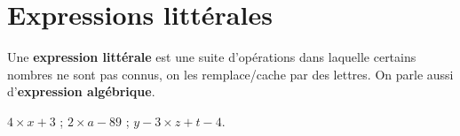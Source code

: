 \section{Expressions littérales} %

\medskip

\begin{definition}
   Une {\bf expression littérale} est une suite d'op\'erations dans laquelle certains nombres ne sont pas connus,
   on les remplace/cache par des lettres. On parle aussi d'{\bf expression algébrique}.
\end{definition}

\begin{exemple}
   $4\times x+3$ \; ; \; $2\times a-89$ \; ; \; $y-3\times z+t-4$.
\end{exemple}